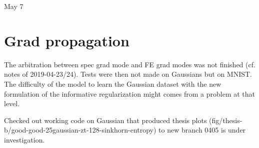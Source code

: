 \documentclass[11pt,a4paper]{article}
\begin{document}

{\Huge May  7}

\section*{Grad propagation}

The arbitration between spec grad mode and FE grad modes was not finished (cf.
notes of 2019-04-23/24). Tests were then not made on Gaussians but on MNIST. The difficulty of
the model to learn the Gaussian dataset with the new formulation of the
informative regularization might comes from a problem at that level.

Checked out working code on Gaussian that produced thesis plots
(fig/thesis-b/good-good-25gaussian-zt-128-sinkhorn-entropy) to new branch 0405 is under
investigation.

\printbibliography{}
\end{document}
